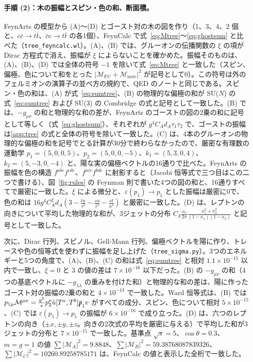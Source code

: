 \documentclass[a4paper,10pt]{ltjsarticle}
\begin{document}
\paragraph{手順 (2)：木の振幅とスピン・色の和、断面積。}FeynArts の模型から (A)〜(D) とゴースト対の木の図を作り（1、3、4、2 個と、$c\bar c\to t\bar t$、$\bar cc\to t\bar t$ の各1個）、FeynCalc で式~\eqref{eq:Mtree}〜\eqref{eq:ghostsum} と比べた（\texttt{tree\_feyncalc.wl}）。(A)、(B) では、グルーオンの伝播関数の $\xi$ の項が Dirac 方程式で消え、振幅が $\xi$ によらないことを確かめた。振幅そのものは、(A)、(B)、(D) では全体の符号 $-1$ を除いて式~\eqref{eq:Mtree} と一致した（スピン、偏極、色について和をとった $|\mathcal M_{\mathrm{FC}}+\mathcal M_{\mathrm{note}}|^2$ が記号として0）。この符号は外のフェルミオンの演算子の並べ方の規約で、QED のノートと同じである。スピン・色の和は、(A) が式~\eqref{eq:sumtree}、(B) の物理的な偏極の和が SU($N$) の式~\eqref{eq:sumtree} および SU(3) の Combridge の式と記号として一致した。(B) では、$-g_{\mu\nu}$ の和と物理的な和の差が、FeynArts のゴーストの図の2乗の和に記号として等しく（式~\eqref{eq:ghostsum}）、それぞれが $g^4C_Ad_A\tau_1\tau_2$ で、ゴーストの振幅は\ref{app:tree} の式と全体の符号を除いて一致した。(C) は、4本のグルーオンの物理的な偏極の和を記号でとる計算が30分で終わらなかったので、厳密な有理数の運動学 $p_1=(5,0,0,5)$、$p_2=(5,0,0,-5)$、$k_1=(5,3,0,4)$、$k_2=(5,-3,0,-4)$ と、陽な実の偏極ベクトルの16通りで比べた。FeynArts の振幅を色の構造 $f^{abe}f^{cde}$、$f^{ace}f^{bde}$ に射影すると（Jacobi 恒等式で三つ目はこの二つで書ける）、図~\ref{fig:rules} の Feynman 則で書いた4つの図の和と、16通りすべてで厳密に一致した。$\xi$ による微分と、$\varepsilon(p_1)\to p_1$ とした振幅は厳密に0で、色の和は $16g^4C_A^2d_A(3-\frac{tu}{s^2}-\frac{su}{t^2}-\frac{st}{u^2})$ と厳密に一致した。(D) は、レプトンの向きについて平均した物理的な和が、3ジェットの分布 $C_F\frac{\alpha_s}{2\pi}\frac{x_1^2+x_2^2}{(1-x_1)(1-x_2)}$ と記号として一致した。

次に、Dirac 行列、スピノル、Gell-Mann 行列、偏極ベクトルを陽に作り、トレースや色の恒等式を使わずに振幅を足し上げた（\texttt{tree\_sigma.py}）。3つのエネルギーと5つの角度で、(A)、(B)、(C) の和は式~\eqref{eq:sumtree} と相対 $1.1\times10^{-15}$ 以内で一致し、$\xi=0$ と $3$ の値の差は $7\times10^{-16}$ 以下だった。(B) の $-g_{\mu\nu}$ の和（4つの基底ベクトルに $-g_{\lambda\lambda}$ の重みを付けた和）と物理的な和の差は、陽に作ったゴースト対の振幅の2乗の和と $4\times10^{-13}$ で一致した。Ward 恒等式は、(B) では $p_{1\mu}\mathcal M^{\mu\nu}=\frac{g^2}sp_2^\nu\bar u[T^a,T^b]\slashed p_1v$ がすべての成分、スピン、色について相対 $5\times10^{-15}$、(C) では $\varepsilon(p_1)\to p_1$ の振幅が $6\times10^{-16}$ で成り立った。(D) は、六つのレプトンの向き（$\pm x,\pm y,\pm z$。向きの2次式の平均を厳密に与える）で平均した和が3ジェットの分布と $7\times10^{-15}$ で一致した。基準点 $\sqrt s=5$、$\cos\theta=0.3$、$m=g=1$ の値 $\sum|\mathcal M_A|^2=9.8848$、$\sum|\mathcal M_B|^2=59.38768087839326$、$\sum|\mathcal M_C|^2=10260.89258785171$ は、FeynCalc の値と表示した全桁で一致した。
\end{document}
